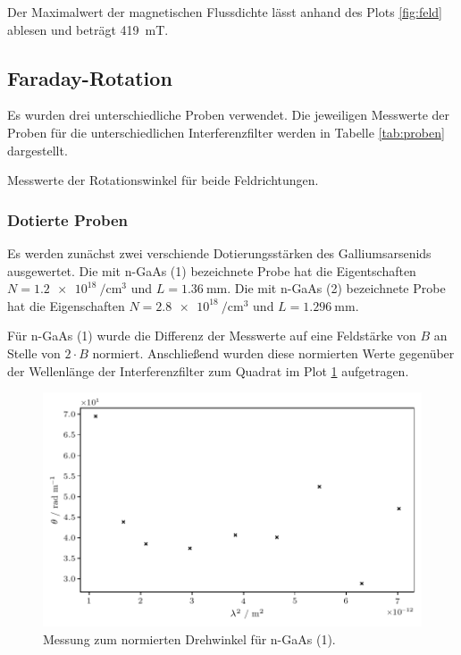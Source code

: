 Der Maximalwert der magnetischen Flussdichte lässt anhand des Plots \ref{fig:feld} ablesen und beträgt
\qty{419}{\milli\tesla}.

\subsection{Faraday-Rotation}

Es wurden drei unterschiedliche Proben verwendet. Die jeweiligen Messwerte der Proben für die unterschiedlichen Interferenzfilter werden
in Tabelle \ref{tab:proben} dargestellt.

\begin{table}[H]
	\centering
	\caption{Messwerte der Rotationswinkel für beide Feldrichtungen.}
	
	\label{tab:proben}
\end{table}

\subsubsection{Dotierte Proben}
\label{sec:Dotierte}

Es werden zunächst zwei verschiende Dotierungsstärken des Galliumsarsenids ausgewertet. Die mit n-GaAs (1) bezeichnete
Probe hat die Eigentschaften $N = \qty{1.2e18}{\per\centi\meter\cubed}$ und $L = \qty{1.36}{\milli\meter}$. Die mit n-GaAs (2)
bezeichnete Probe hat die Eigenschaften $N = \qty{2.8e18}{\per\centi\meter\cubed}$ und $L = \qty{1.296}{\milli\meter}$.

Für n-GaAs (1) wurde die Differenz der Messwerte auf eine Feldstärke von $B$ an Stelle von $2 \cdot B$ normiert.
Anschließend wurden diese normierten Werte gegenüber der Wellenlänge der Interferenzfilter zum Quadrat im
Plot \ref{fig:dotiert-1} aufgetragen.

\begin{figure}[H]
    \centering
    \includegraphics{build/doped-1.pdf}
    \caption{Messung zum normierten Drehwinkel für n-GaAs (1).}
    \label{fig:dotiert-1}
\end{figure}

